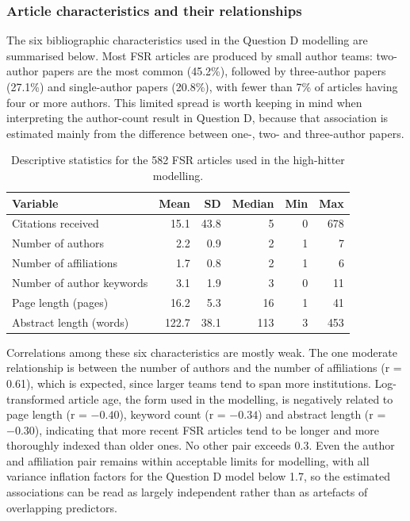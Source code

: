 \documentclass[11pt,a4paper]{article}
\begin{document}
\subsubsection{Article characteristics and their relationships}\label{article-characteristics-and-their-relationships}

The six bibliographic characteristics used in the Question D modelling are summarised below. Most FSR articles are produced by small author teams: two-author papers are the most common (45.2\%), followed by three-author papers (27.1\%) and single-author papers (20.8\%), with fewer than 7\% of articles having four or more authors. This limited spread is worth keeping in mind when interpreting the author-count result in Question D, because that association is estimated mainly from the difference between one-, two- and three-author papers.

\begin{table}[htbp]
\centering
\small
\caption{Descriptive statistics for the 582 FSR articles used in the high-hitter modelling.}
\label{tab:eda_descriptives}
\begin{tabular}{lrrrrr}
\toprule
Variable & Mean & SD & Median & Min & Max \\
\midrule
Citations received & 15.1 & 43.8 & 5 & 0 & 678 \\
Number of authors & 2.2 & 0.9 & 2 & 1 & 7 \\
Number of affiliations & 1.7 & 0.8 & 2 & 1 & 6 \\
Number of author keywords & 3.1 & 1.9 & 3 & 0 & 11 \\
Page length (pages) & 16.2 & 5.3 & 16 & 1 & 41 \\
Abstract length (words) & 122.7 & 38.1 & 113 & 3 & 453 \\
\bottomrule
\end{tabular}

\end{table}

Correlations among these six characteristics are mostly weak. The one moderate relationship is between the number of authors and the number of affiliations (r = 0.61), which is expected, since larger teams tend to span more institutions. Log-transformed article age, the form used in the modelling, is negatively related to page length (r = \(-0.40\)), keyword count (r = \(-0.34\)) and abstract length (r = \(-0.30\)), indicating that more recent FSR articles tend to be longer and more thoroughly indexed than older ones. No other pair exceeds 0.3. Even the author and affiliation pair remains within acceptable limits for modelling, with all variance inflation factors for the Question D model below 1.7, so the estimated associations can be read as largely independent rather than as artefacts of overlapping predictors.
\end{document}

